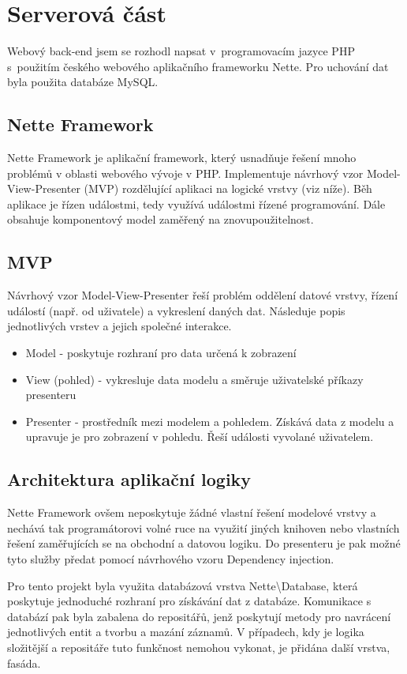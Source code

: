 \documentclass[11pt,twoside,a4paper]{book}
\newcommand*{\nomExpl}[2]{#2 (#1)\nomenclature{#1}{#2}} 	%
\begin{document}
\section{Serverová část}
Webový back-end jsem se rozhodl napsat v~programovacím jazyce PHP s~použitím českého webového aplikačního frameworku Nette\cite{nette}. Pro uchování dat byla použita databáze MySQL\cite{mysql}.

\subsection{Nette Framework}
Nette Framework je aplikační framework, který usnadňuje řešení mnoho problémů v oblasti webového vývoje v PHP. Implementuje návrhový vzor \nomExpl{MVP}{Model-View-Presenter} rozdělující aplikaci na logické vrstvy (viz níže). Běh aplikace je řízen událostmi, tedy využívá událostmi řízené programování. Dále obsahuje komponentový model zaměřený na znovupoužitelnost.

\subsection{MVP}
Návrhový vzor Model-View-Presenter řeší problém oddělení datové vrstvy, řízení událostí (např. od uživatele) a vykreslení daných dat\citep{mvp}. Následuje popis jednotlivých vrstev a jejich společné interakce.

\begin{itemize}
	\item Model - poskytuje rozhraní pro data určená k zobrazení
	\item View (pohled) - vykresluje data modelu a směruje uživatelské příkazy presenteru
	\item Presenter - prostředník mezi modelem a pohledem. Získává data z modelu a upravuje je pro zobrazení v pohledu. Řeší události vyvolané uživatelem.
\end{itemize}

\subsection{Architektura aplikační logiky}
Nette Framework ovšem neposkytuje žádné vlastní řešení modelové vrstvy a nechává tak programátorovi volné ruce na využití jiných knihoven nebo vlastních řešení zaměřujících se na obchodní a datovou logiku. Do presenteru je pak možné tyto služby předat pomocí návrhového vzoru Dependency injection\cite{di}.

Pro tento projekt byla využita databázová vrstva Nette\textbackslash{}Database, která poskytuje jednoduché rozhraní pro získávání dat z databáze. Komunikace s databází pak byla zabalena do repositářů, jenž poskytují metody pro navrácení jednotlivých entit a tvorbu a mazání záznamů. V případech, kdy je logika složitější a repositáře tuto funkčnost nemohou vykonat, je přidána další vrstva, fasáda. 
\end{document}

